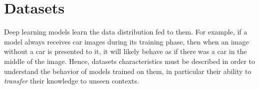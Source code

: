 
%
%
%
%

\section{Datasets}
Deep learning models learn the data distribution fed to them.
For example, if a model always receives car images during its training phase, then when an image without a car is presented to it, it will likely behave as if there was a car in the middle of the image.
Hence, datasets characteristics must be described in order to understand the behavior of models trained on them, in particular their ability to \textit{transfer} their knowledge to unseen contexts.

